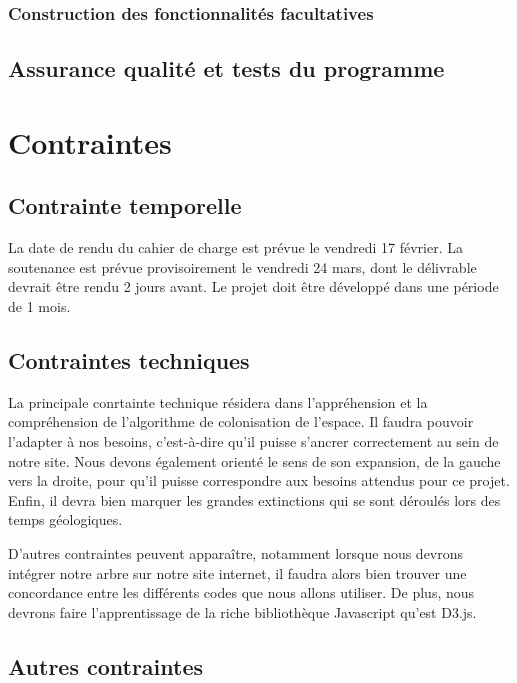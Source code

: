 \documentclass[a4paper]{article}
\begin{document}
			

		\subsubsection{Construction des fonctionnalités facultatives}

			

	\subsection{Assurance qualité et tests du programme}

		

\section{Contraintes}

	\subsection{Contrainte temporelle}
		La date de rendu du cahier de charge est prévue le vendredi 17 février.
		La soutenance est prévue provisoirement le vendredi 24 mars, dont le délivrable devrait être rendu 2 jours avant.
		Le projet doit être développé dans une période de 1 mois.

	\subsection{Contraintes techniques}
		La principale conrtainte technique résidera dans l'appréhension et la compréhension de l'algorithme de colonisation de l'espace. Il faudra pouvoir l'adapter à nos besoins, c'est-à-dire qu'il puisse s'ancrer correctement au sein de notre site. Nous devons également orienté le sens de son expansion, de la gauche vers la droite, pour qu'il puisse correspondre aux besoins attendus pour ce projet. Enfin, il devra bien marquer les grandes extinctions qui se sont déroulés lors des temps géologiques.

		D'autres contraintes peuvent apparaître, notamment lorsque nous devrons intégrer notre arbre sur notre site internet, il faudra alors bien trouver une concordance entre les différents codes que nous allons utiliser. De plus, nous devrons faire l'apprentissage de la riche bibliothèque Javascript qu'est D3.js.
		

	\subsection{Autres contraintes}
\end{document}
